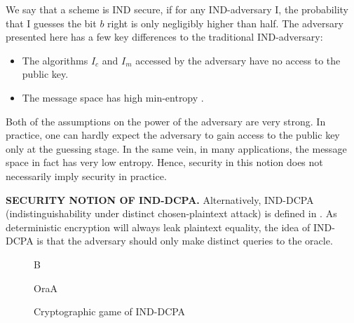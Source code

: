 \documentclass[10pt]{book}
\begin{document}
We say that a scheme is IND secure, if for any IND-adversary I, the probability that I guesses the bit $b$ right is only negligibly higher than half. The adversary presented here has a few key differences to the traditional IND-adversary:
\begin{itemize}
	\item
	The algorithms $I_c$ and $I_m$ accessed by the adversary have no access to the public key.
	\item
	The message space has high min-entropy \cite{2008arXiv0807.1338K}.
\end{itemize}

Both of the assumptions on the power of the adversary are very strong. In practice, one can hardly expect the adversary to gain access to the public key only at the guessing stage. In the same vein, in many applications, the message space in fact has very low entropy. Hence, security in this notion does not necessarily imply security in practice.

\textbf{SECURITY NOTION OF IND-DCPA.} Alternatively, IND-DCPA (indistinguishability under distinct chosen-plaintext attack) is defined in \cite{Bellare:2002:AES:586110.586112}. As deterministic encryption will always leak plaintext equality, the idea of IND-DCPA is that the adversary should only make distinct queries to the oracle.

\begin{figure}[H]
	\begin{center}
	\begin{bbrenv}{B}
		\begin{bbrbox}[name=Adversary, minheight=3.5cm, minwidth=2.5cm]
		\end{bbrbox}
		
		\bbrmsgspace{1cm}
		\bbrmsgspace{1cm}
		
		\begin{bbroracle}{OraA}
			\begin{bbrbox}[name={Encryption}, minheight=1cm]
			\end{bbrbox}
		\end{bbroracle}
		
	\end{bbrenv}
	\end{center}

	\caption{Cryptographic game of IND-DCPA}
\end{figure}
\end{document}
